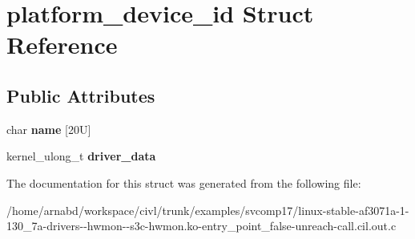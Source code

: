 \hypertarget{structplatform__device__id}{}\section{platform\+\_\+device\+\_\+id Struct Reference}
\label{structplatform__device__id}
\subsection*{Public Attributes}
\begin{DoxyCompactItemize}
\item 
\hypertarget{structplatform__device__id_a59669d94b46da88c2574f9bd653a614e}{}char {\bfseries name} \mbox{[}20\+U\mbox{]}\label{structplatform__device__id_a59669d94b46da88c2574f9bd653a614e}

\item 
\hypertarget{structplatform__device__id_a03e55cd823e82065e177a7410752af01}{}kernel\+\_\+ulong\+\_\+t {\bfseries driver\+\_\+data}\label{structplatform__device__id_a03e55cd823e82065e177a7410752af01}

\end{DoxyCompactItemize}


The documentation for this struct was generated from the following file\+:\begin{DoxyCompactItemize}
\item 
/home/arnabd/workspace/civl/trunk/examples/svcomp17/linux-\/stable-\/af3071a-\/1-\/130\+\_\+7a-\/drivers-\/-\/hwmon-\/-\/s3c-\/hwmon.\+ko-\/entry\+\_\+point\+\_\+false-\/unreach-\/call.\+cil.\+out.\+c\end{DoxyCompactItemize}
